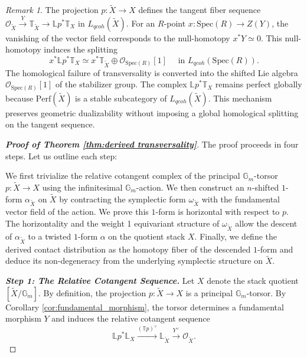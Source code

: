 \documentclass[reqno]{amsart}
\theoremstyle{definition}
\theoremstyle{remark}
\newtheorem{remark}[theorem]{Remark}
\newcommand{\LL}{\mathbb{L}}
\newcommand{\TT}{\mathbb{T}}
\newcommand{\Gm}{\mathbb{G}_m}
\newcommand{\cO}{\mathcal{O}}
\begin{document}
{\begin{remark}
The projection $p \colon \widetilde{X} \to X$ defines the tangent fiber sequence $\cO_{\widetilde{X}} \xrightarrow{Y} \TT_{\widetilde{X}} \to \mathbb{L}p^* \TT_X$ in $L_{qcoh}(\widetilde{X})$. For an $R$-point $x \colon \mathrm{Spec}(R) \to Z(Y)$, the vanishing of the vector field corresponds to the null-homotopy $x^*Y \simeq 0$. This null-homotopy induces the splitting $$x^*\mathbb{L}p^*\TT_X \simeq x^*\TT_{\widetilde{X}} \oplus \cO_{\mathrm{Spec}(R)}[1] \quad \text{ in } L_{qcoh}(\mathrm{Spec}(R)).$$ The homological failure of transversality is converted into the shifted Lie algebra $\cO_{\mathrm{Spec}(R)}[1]$ of the stabilizer group. The complex $\mathbb{L}p^*\TT_X$ remains perfect globally because $\mathrm{Perf}(\widetilde{X})$ is a stable subcategory of $L_{qcoh}(\widetilde{X})$. This mechanism preserves geometric dualizability without imposing a global homological splitting on the tangent sequence.
\end{remark}

\begin{proof}[\textbf{Proof of Theorem \ref{thm:derived transversality}}]
  The proof proceeds in four steps. Let us outline each step: 
  
  We first trivialize the relative cotangent complex of the principal $\Gm$-torsor $p \colon \widetilde{X} \to X$ using the infinitesimal $\Gm$-action. We then construct an $n$-shifted $1$-form $\alpha_{\widetilde{X}}$ on $\widetilde{X}$ by contracting the symplectic form $\omega_{\widetilde{X}}$ with the fundamental vector field of the action. We prove this $1$-form is horizontal with respect to $p$. The horizontality and the weight 1 equivariant structure of $\omega_{\widetilde{X}}$ allow the descent of $\alpha_{\widetilde{X}}$ to a twisted $1$-form $\alpha$ on the quotient stack $X$. Finally, we define the derived contact distribution as the homotopy fiber of the descended $1$-form and deduce its non-degeneracy from the underlying symplectic structure on $\widetilde{X}$.
\vspace{5pt}

  \textbf{\textit{Step 1: The Relative Cotangent Sequence.}}
  Let $X$ denote the stack quotient $[\widetilde{X} / \Gm]$. By definition, the projection $p \colon \widetilde{X} \to X$ is a principal $\Gm$-torsor. By Corollary \ref{cor:fundamental_morphism}, the torsor determines a fundamental morphism $Y$ and induces the relative cotangent sequence
  \begin{equation*}
    \LL p^* \LL_X \xrightarrow{(\TT p)^\vee} \LL_{\widetilde{X}} \xrightarrow{Y^\vee} \cO_{\widetilde{X}}.
  \end{equation*}


\end{proof}}
\end{document}
